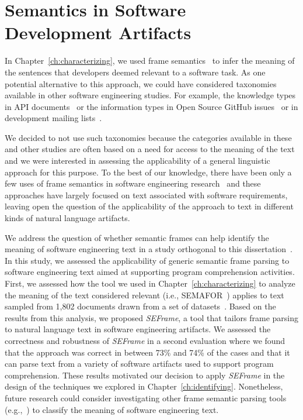 

\section{Semantics in Software Development Artifacts}
\label{cp7:semantics}



In Chapter~\ref{ch:characterizing}, we used frame semantics~\cite{fillmore1976frame}
to infer the meaning of the sentences
that developers deemed relevant to  a software task.
As one potential alternative to this approach, 
we could have considered 
taxonomies
available in other software engineering studies. 
For example, the knowledge types in API documents~\cite{Maalej2013}
or the information types in Open Source GitHub issues~\cite{Arya2019} or 
in development mailing lists~\cite{Sorbo2015}.



We decided to not use such taxonomies because the categories available in these and other studies 
are often based
on a need for access to the meaning of
the text
and we were interested in assessing the
applicability of a general linguistic approach for this purpose.
To the best of our knowledge, there have been only a few uses of frame
semantics in software engineering research~\cite{jha2017, kundi2017, alhoshan2019using}
and these approaches
have largely focused on text associated
with software requirements, leaving open the
question of the applicability of the approach to
text in different kinds of natural language artifacts.



We address the question of whether semantic
frames can help identify the meaning of
software engineering text
in a study 
orthogonal to this dissertation~\cite{marques2021}. 
In this study, we assessed the applicability of generic semantic frame
parsing to software engineering text
aimed at supporting program
comprehension activities.
First, we assessed how the tool we used in Chapter~\ref{ch:characterizing}
to analyze the meaning of the text considered relevant (i.e., SEMAFOR~\cite{das2014frame})
 applies to text sampled from 1,802 documents drawn from a set of datasets~\cite{Arya2019, Xu2017, Maalej2013, Chaparro2017}. 
Based on the results from this analysis, 
we proposed \textit{SEFrame}, a tool that tailors 
frame parsing to natural language text in software engineering artifacts.
We assessed the correctness and robustness of \textit{SEFrame} in a second evaluation where we found that the approach was 
 correct in between 73\% and 74\% of
the cases and that it can parse text from a variety of software artifacts used to support program
comprehension. These results motivated our decision to apply \textit{SEFrame} 
in the design of the techniques we explored in Chapter~\ref{ch:identifying}.
Nonetheless,  
future research could consider
investigating other 
frame semantic parsing tools (e.g.,~\cite{swayamdipta17, chen2021joint}) 
to classify the meaning of software engineering text.
 




